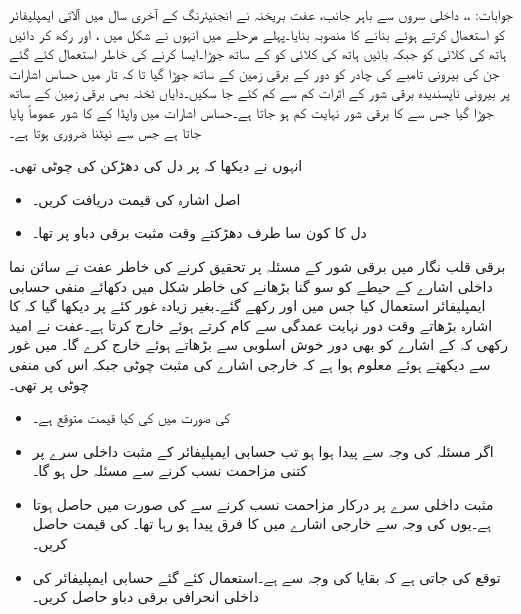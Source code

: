 جوابات: ،، داخلی سروں سے باہر جانب، 
عفت بریخنہ نے انجنیئرنگ کے آخری سال میں آلاتی ایمپلیفائر کو استعمال کرتے ہوئے  بنانے کا منصوبہ بنایا۔پہلے مرحلے میں انہوں نے شکل  میں ،  اور  رکھ کر دائیں ہاتھ کی کلائی کو  جبکہ بائیں ہاتھ کی کلائی کو  کے ساتھ جوڑا۔ایسا کرنے کی خاطر  استعمال کئے گئے جن کی بیرونی تامبے کی چادر کو دور کے برقی زمین کے ساتھ جوڑا گیا تا کہ تار میں حساس اشارات پر بیرونی ناپسندیدہ برقی شور کے اثرات کم سے کم کئے جا سکیں۔دایاں ٹخنہ بھی برقی زمین کے ساتھ جوڑا گیا جس سے  کا برقی شور نہایت کم ہو جاتا ہے۔حساس اشارات میں واپڈا کے  کا شور عموماً پایا جاتا ہے جس سے نپٹنا ضروری ہوتا ہے۔

انہوں نے دیکھا کہ  پر دل کی دھڑکن کی چوٹی  تھی۔
\begin{itemize}
\item
اصل اشارہ  کی قیمت دریافت کریں۔
\item
دل کا کون سا طرف دھڑکتے وقت مثبت برقی دباو پر تھا۔
\end{itemize}

برقی قلب نگار میں برقی شور کے مسئلہ پر تحقیق کرنے کی خاطر عفت نے سائن نما داخلی اشارے کے حیطے کو سو گنا بڑھانے کی خاطر  شکل  میں دکھائے منفی حسابی ایمپلیفائر استعمال کیا جس میں   اور  رکھے گئے۔بغیر زیادہ غور کئے  پر دیکھا گیا کہ  کا اشارہ بڑھاتے وقت دور نہایت عمدگی سے کام کرتے ہوئے  خارج کرتا ہے۔عفت نے امید رکھی کہ  کے اشارے کو بھی دور خوش اسلوبی سے بڑھاتے ہوئے  خارج کرے گا۔ میں غور سے دیکھتے ہوئے معلوم ہوا ہے کہ خارجی اشارے  کی مثبت چوٹی  جبکہ اس کی منفی چوٹی  پر تھی۔

\begin{itemize}
\item
{} کی صورت میں  کی کیا قیمت متوقع ہے۔
\item
اگر مسئلہ  کی وجہ سے پیدا ہوا ہو تب حسابی ایمپلیفائر کے مثبت داخلی سرے  پر  کتنی مزاحمت نسب کرنے سے مسئلہ حل ہو گا۔
\item
مثبت داخلی سرے  پر درکار مزاحمت نسب کرنے سے  کی صورت میں  حاصل ہوتا ہے۔یوں  کی وجہ سے خارجی اشارے میں  کا فرق پیدا ہو رہا تھا۔ کی قیمت حاصل کریں۔
\item 
توقع کی جاتی ہے کہ بقایا   کی وجہ سے ہے۔استعمال کئے گئے حسابی ایمپلیفائر کی داخلی انحرافی برقی دباو  حاصل کریں۔
\end{itemize}

